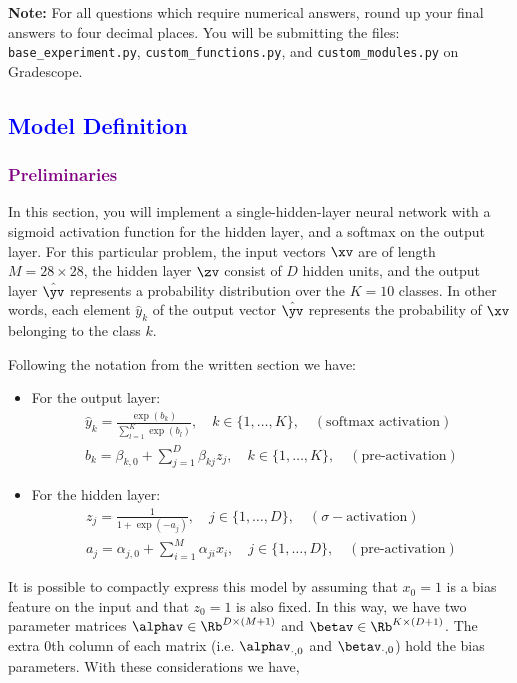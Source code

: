 \textbf{Note:} For all questions which require numerical answers, round up your final answers to four decimal places. You will be submitting the files: \texttt{base\_experiment.py}, \texttt{custom\_functions.py}, and \texttt{custom\_modules.py} on Gradescope.

\newpage

\subsection*{\textcolor{blue}{Model Definition}}
\subsubsection*{\textcolor{purple}{Preliminaries}}
In this section, you will implement a single-hidden-layer neural network with a sigmoid activation function for the hidden layer, and a softmax on the output layer. For this particular problem, the input vectors $\xv$ are of length $M = 28\times 28$, the hidden layer $\zv$ consist of $D$ hidden units, and the output layer $\hat{\yv}$ represents a probability distribution over the $K = 10$ classes. In other words, each element $\hat{y}_k$ of the output vector $\hat{\yv}$ represents the probability of $\xv$ belonging to the class $k$. 

Following the notation from the written section we have:
\begin{itemize}
    \item For the output layer:
    \begin{gather*}
         \hat{y}_k = \frac{\exp(b_k)}{\sum_{l=1}^K \exp(b_l)},\quad k\in\{1,\dots,K\},\quad (\text{softmax activation})\\[3mm]
         b_k =  \beta_{k,0} + \sum_{j=1}^D \beta_{kj} z_j,\quad k\in\{1,\dots,K\},\quad (\text{pre-activation})
    \end{gather*}    
    \item For the hidden layer:
    \begin{gather*}
        z_j = \frac{1}{1+\exp(-a_j)},\quad j\in\{1,\dots,D\},\quad (\sigma-\text{activation})\\[3mm]
        a_j = \alpha_{j,0} + \sum_{i=1}^M \alpha_{ji} x_i,\quad j\in\{1,\dots,D\},\quad (\text{pre-activation})
    \end{gather*}        
\end{itemize}


It is possible to compactly express this model by assuming that $x_0=1$ is a bias feature on the input and that $z_0=1$ is also fixed. In this way, we have two parameter matrices $\alphav \in \Rb^{D \times (M+1)}$ and $\betav \in \Rb^{K \times (D+1)}$. The extra $0$th column of each matrix (i.e. $\alphav_{\cdot,0}$ and $\betav_{\cdot,0}$) hold the bias parameters. With these considerations we have,

